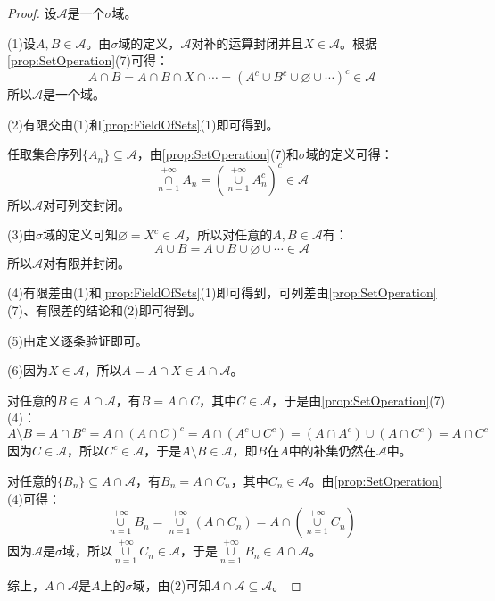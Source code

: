 \begin{proof}
	设$\mathscr{A}$是一个$\sigma$域。\par
	(1)设$A,B\in\mathscr{A}$。由$\sigma$域的定义，$\mathscr{A}$对补的运算封闭并且$X\in\mathscr{A}$。根据\cref{prop:SetOperation}(7)可得：
	\begin{equation*}
		A\cap B=A\cap B\cap X\cap\cdots=(A^c\cup B^c\cup\varnothing\cup\cdots)^c\in\mathscr{A}
	\end{equation*}
	所以$\mathscr{A}$是一个域。\par
	(2)有限交由(1)和\cref{prop:FieldOfSets}(1)即可得到。\par
	任取集合序列$\{A_n\}\subseteq\mathscr{A}$，由\cref{prop:SetOperation}(7)和$\sigma$域的定义可得：
	\begin{equation*}
		\underset{n=1}{\overset{+\infty}{\cap}}A_n=\left(\underset{n=1}{\overset{+\infty}{\cup}}A_n^c\right)^c\in\mathscr{A}
	\end{equation*}
	所以$\mathscr{A}$对可列交封闭。\par
	(3)由$\sigma$域的定义可知$\varnothing=X^c\in\mathscr{A}$，所以对任意的$A,B\in\mathscr{A}$有：
	\begin{equation*}
		A\cup B=A\cup B\cup\varnothing\cup\cdots\in\mathscr{A}
	\end{equation*}
	所以$\mathscr{A}$对有限并封闭。\par
	(4)有限差由(1)和\cref{prop:FieldOfSets}(1)即可得到，可列差由\cref{prop:SetOperation}(7)、有限差的结论和(2)即可得到。\par
	(5)由定义逐条验证即可。\par
	(6)因为$X\in\mathscr{A}$，所以$A=A\cap X\in A\cap\mathscr{A}$。\par
	对任意的$B\in A\cap\mathscr{A}$，有$B=A\cap C$，其中$C\in\mathscr{A}$，于是由\cref{prop:SetOperation}(7)(4)：
	\begin{equation*}
		A\setminus B=A\cap B^c=A\cap(A\cap C)^c=A\cap(A^c\cup C^c)=(A\cap A^c)\cup(A\cap C^c)=A\cap C^c
	\end{equation*}
	因为$C\in\mathscr{A}$，所以$C^c\in\mathscr{A}$，于是$A\setminus B\in\mathscr{A}$，即$B$在$A$中的补集仍然在$\mathscr{A}$中。\par
	对任意的$\{B_n\}\subseteq A\cap\mathscr{A}$，有$B_n=A\cap C_n$，其中$C_n\in\mathscr{A}$。由\cref{prop:SetOperation}(4)可得：
	\begin{equation*}
		\underset{n=1}{\overset{+\infty}{\cup}}B_n=\underset{n=1}{\overset{+\infty}{\cup}}(A\cap C_n)=A\cap\left(\underset{n=1}{\overset{+\infty}{\cup}}C_n\right)
	\end{equation*}
	因为$\mathscr{A}$是$\sigma$域，所以$\underset{n=1}{\overset{+\infty}{\cup}}C_n\in\mathscr{A}$，于是$\underset{n=1}{\overset{+\infty}{\cup}}B_n\in A\cap\mathscr{A}$。\par
	综上，$A\cap\mathscr{A}$是$A$上的$\sigma$域，由(2)可知$A\cap\mathscr{A}\subseteq\mathscr{A}$。
\end{proof}
